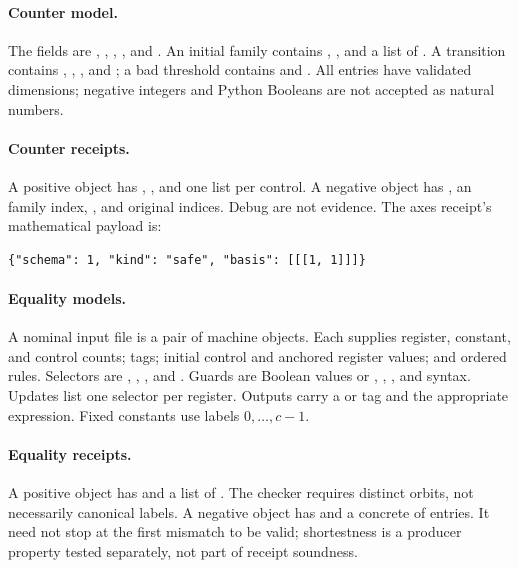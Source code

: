 \paragraph{Counter model.}
The fields are , , ,
, and . An initial family contains ,
, and a list of . A transition contains ,
, , and ; a bad threshold contains
 and . All entries have validated dimensions;
negative integers and Python Booleans are not accepted as natural numbers.

\paragraph{Counter receipts.}
A positive object has , , and one
 list per control. A negative object has ,
an  family index, , and original
 indices. Debug  are not evidence. The axes
receipt's mathematical payload is:
\begin{lstlisting}
{"schema": 1, "kind": "safe", "basis": [[[1, 1]]]}
\end{lstlisting}

\paragraph{Equality models.}
A nominal input file is a pair of machine objects. Each supplies register,
constant, and control counts; tags; initial control and anchored register values;
and ordered rules. Selectors are \code{["input"]}, \code{["null"]},
\code{["reg", i]}, and \code{["const", j]}. Guards are Boolean values or
, , , and  syntax. Updates list one
selector per register. Outputs carry a  or  tag and the
appropriate expression. Fixed constants use labels $0,\ldots,c-1$.

\paragraph{Equality receipts.}
A positive object has  and a  list of
. The checker requires distinct
orbits, not necessarily canonical labels. A negative object has
 and a concrete  of 
entries. It need not stop at the first mismatch to be valid; shortestness is a
producer property tested separately, not part of receipt soundness.

